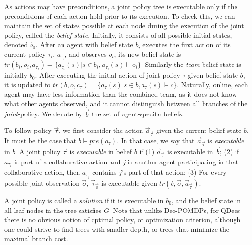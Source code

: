 \documentclass[letterpaper]{article} %
\theoremstyle{definition}
\begin{document}
As actions may have preconditions, a joint policy tree is executable only if the preconditions of each action hold prior to its execution. To check this, we can maintain the set of states possible at each node during the execution of the joint policy, called the
\emph{belief state}. Initially, it consists of all possible initial states, denoted $b_0$.
After an agent with belief state $b_i$ executes the first action of its current policy $\tau_i$, $a_{\tau_i}$, and observes ${o_i}$, its new belief state is 
$tr(b_i,o_i,{a}_{\tau_i}) = \{a_{\tau_i}(s) | s\in b_i, a_{\tau_i}(s)\models o_i\}$.
Similarly the {\em team} belief state is
initially $b_0$. After executing the initial action of joint-policy $\tau$ given belief state $b$, it is updated to  
$tr(b,\bar{o},\bar{a}_{\tau}) = \{\bar{a}_{\tau}(s) | s\in b, \bar{a}_{\tau}(s)\models \bar{o}\}$.
Naturally, 
online, each agent may have less information than the combined team, as it does not know what other agents observed, and it cannot distinguish between all branches of the {\em joint}-policy. We denote by $\vec{b}$ the set of agent-specific beliefs.

To follow policy $\vec{\tau}$, we first consider the action $\vec{a}_{\vec{\tau}}$ given the current belief state $b$. It must be the case that 
$b \models pre(a_{\tau})$. In that case, we say that  $\vec{a}_{\vec{\tau}}$ is {\em executable} in $b$.
%
A  joint policy  $\vec{\tau}$ is {\em executable} in belief  $b$ if (1) $\vec{a}_{\vec{\tau}}$ is executable in $\vec{b}$;  (2) if $a_{\tau_i}$ is  part of a collaborative action and $j$ is another agent participating in that collaborative action, then $a_{\tau_j}$ contains $j$'s part of that action;
(3) For every possible joint observation $\vec{o}$,    $\vec{\tau}_{\vec{o}}$ is executable given $tr(b,\vec{o},\vec{a}_{\vec{\tau}})$.

A joint policy is called a {\em solution} if it is executable in $b_0$, and the belief state in all leaf nodes in the tree satisfies $G$. 
Note that unlike Dec-POMDPs, for QDecs there is no obvious notion of optimal policy, or optimization criterion, although one could strive to find trees with smaller depth, or trees that minimize the maximal branch cost.
\end{document}
